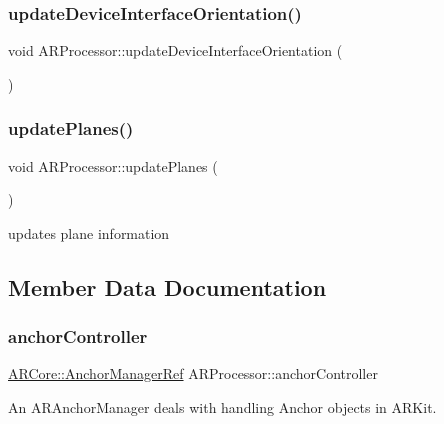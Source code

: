 \subsubsection{\texorpdfstring{update\+Device\+Interface\+Orientation()}{updateDeviceInterfaceOrientation()}}
{\footnotesize\ttfamily void A\+R\+Processor\+::update\+Device\+Interface\+Orientation (\begin{DoxyParamCaption}{ }\end{DoxyParamCaption})}

\mbox{\label{class_a_r_processor_aaa1488d9082ec598fd4aeb5c5c43d999}} 
\subsubsection{\texorpdfstring{update\+Planes()}{updatePlanes()}}
{\footnotesize\ttfamily void A\+R\+Processor\+::update\+Planes (\begin{DoxyParamCaption}{ }\end{DoxyParamCaption})}



updates plane information 



\subsection{Member Data Documentation}
\mbox{\label{class_a_r_processor_a8a1a8f16b30d2b0b4839a30d7ba4763d}} 
\subsubsection{\texorpdfstring{anchor\+Controller}{anchorController}}
{\footnotesize\ttfamily \hyperlink{namespace_a_r_core_a3f2b9ba00b51ce19c1010f554a66a512}{A\+R\+Core\+::\+Anchor\+Manager\+Ref} A\+R\+Processor\+::anchor\+Controller}



An A\+R\+Anchor\+Manager deals with handling Anchor objects in A\+R\+Kit. 

\mbox{\label{class_a_r_processor_a0df4995c56cb187db281726d7631d9ed}} 
